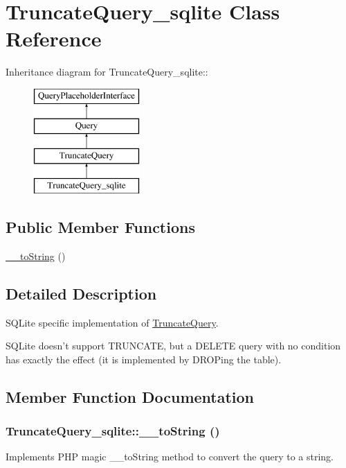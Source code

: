 \hypertarget{classTruncateQuery__sqlite}{
\section{TruncateQuery\_\-sqlite Class Reference}
\label{classTruncateQuery__sqlite}
}
Inheritance diagram for TruncateQuery\_\-sqlite::\begin{figure}[H]
\begin{center}
\leavevmode
\includegraphics[height=4cm]{classTruncateQuery__sqlite}
\end{center}
\end{figure}
\subsection*{Public Member Functions}
\begin{DoxyCompactItemize}
\item 
\hyperlink{classTruncateQuery__sqlite_a5b051a5c4f35a4c8e91cb7ecb38f7dcf}{\_\-\_\-toString} ()
\end{DoxyCompactItemize}


\subsection{Detailed Description}
SQLite specific implementation of \hyperlink{classTruncateQuery}{TruncateQuery}.

SQLite doesn't support TRUNCATE, but a DELETE query with no condition has exactly the effect (it is implemented by DROPing the table). 

\subsection{Member Function Documentation}
\hypertarget{classTruncateQuery__sqlite_a5b051a5c4f35a4c8e91cb7ecb38f7dcf}{
\subsubsection[{\_\-\_\-toString}]{\setlength{\rightskip}{0pt plus 5cm}TruncateQuery\_\-sqlite::\_\-\_\-toString ()}}
\label{classTruncateQuery__sqlite_a5b051a5c4f35a4c8e91cb7ecb38f7dcf}
Implements PHP magic \_\-\_\-toString method to convert the query to a string.

